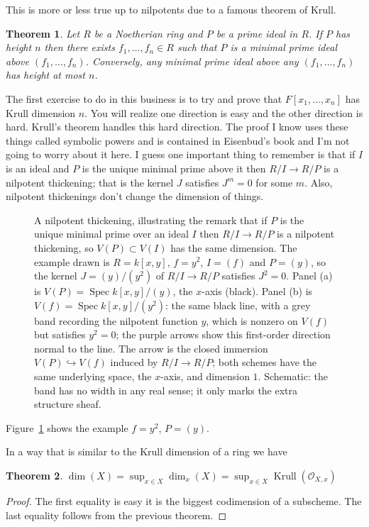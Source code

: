 \documentclass[12pt]{article}
\numberwithin{equation}{section}
\newtheorem{theorem}{Theorem}[subsection]
\theoremstyle{definition}
\theoremstyle{remark}
\newcommand{\Ocal}{\mathcal{O}}
\newcommand{\Spec}{\operatorname{Spec}}
\newcommand{\Krull}{\operatorname{Krull}}
\begin{document}
This is more or less true up to nilpotents due to a famous theorem of Krull. 
\begin{theorem}
	Let $R$ be a Noetherian ring and $P$ be a prime ideal in $R$. 
	If $P$ has height $n$ then there exists $f_1,\ldots,f_n\in R$ such that $P$ is a minimal prime ideal above $(f_1,\ldots,f_n)$. 
	Conversely, any minimal prime ideal above any $(f_1,\ldots,f_n)$ has height at most $n$.
\end{theorem}
The first exercise to do in this business is to try and prove that $F[x_1,\ldots,x_n]$ has Krull dimension $n$.
You will realize one direction is easy and the other direction is hard. 
Krull's theorem handles this hard direction. 
The proof I know uses these things called symbolic powers and is contained in Eisenbud's book and I'm not going to worry about it here.
I guess one important thing to remember is that if $I$ is an ideal and $P$ is the unique minimal prime above it then $R/I \to R/P$ is a nilpotent thickening; that is the kernel $J$ satisfies $J^m=0$ for some $m$. 
Also, nilpotent thickenings don't change the dimension of things. 

\begin{figure}[H]
\centering

\caption{A nilpotent thickening, illustrating the remark that if $P$ is the unique minimal prime over an ideal $I$ then $R/I\to R/P$ is a nilpotent thickening, so $V(P)\subset V(I)$ has the same dimension. The example drawn is $R=k[x,y]$, $f=y^2$, $I=(f)$ and $P=(y)$, so the kernel $J=(y)/(y^2)$ of $R/I\to R/P$ satisfies $J^2=0$. Panel (a) is $V(P)=\Spec k[x,y]/(y)$, the $x$-axis (black). Panel (b) is $V(f)=\Spec k[x,y]/(y^2)$: the same black line, with a grey band recording the nilpotent function $y$, which is nonzero on $V(f)$ but satisfies $y^2=0$; the purple arrows show this first-order direction normal to the line. The arrow is the closed immersion $V(P)\hookrightarrow V(f)$ induced by $R/I\to R/P$; both schemes have the same underlying space, the $x$-axis, and dimension $1$. Schematic: the band has no width in any real sense; it only marks the extra structure sheaf.}\label{fig:nilpotent-thickening}
\end{figure}
Figure~\ref{fig:nilpotent-thickening} shows the example $f=y^2$, $P=(y)$.

In a way that is similar to the Krull dimension of a ring we have 
\begin{theorem}
	$\dim(X) = \sup_{x\in X} \dim_x(X)=\sup_{x\in X} \Krull(\Ocal_{X,x})$
\end{theorem}
\begin{proof}
	The first equality is easy it is the biggest codimension of a subscheme. 
	The last equality follows from the previous theorem.
\end{proof}
\end{document}
